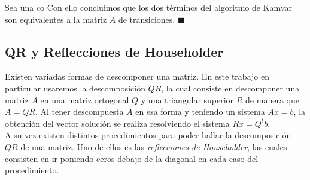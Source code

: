 Sea una co
Con ello concluimos que los dos términos del algoritmo de Kamvar son equivalentes
a la matriz $A$ de transiciones. $ \blacksquare $


\subsection{QR y Reflecciones de Householder}

Existen variadas formas de descomponer una matriz. En este trabajo en particular usaremos la descomposición $QR$,
la cual consiste en descomponer una matriz $A$ en una matriz ortogonal $Q$ y una triangular superior $R$
de manera que $A = QR$. Al tener descompuesta $A$ en esa forma y teniendo un sistema $Ax= b$,
la obtención del vector solución se realiza resolviendo el sistema $Rx = Q^{t}b$.\\

A su vez existen distintos procedimientos para poder hallar la descomposición $QR$ de una matriz.
Uno de ellos es las \textit{reflecciones de Householder}, las cuales consisten en ir
poniendo ceros debajo de la diagonal en cada caso del procedimiento.


